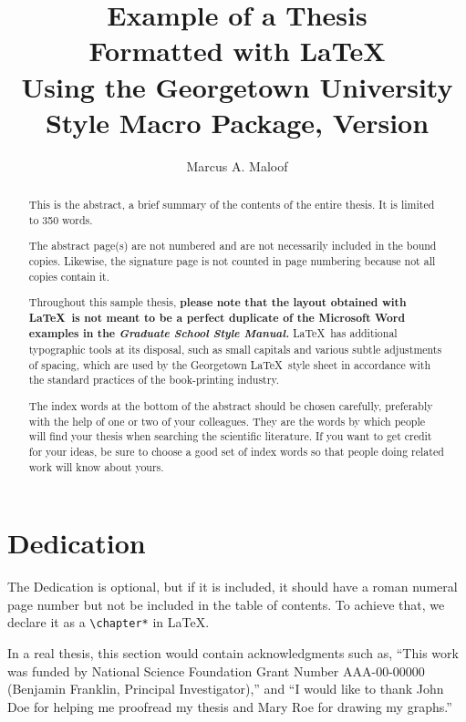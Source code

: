 \documentclass[12pt]{report}
\title{Example of a Thesis \\
       Formatted with LaTeX \\
       Using the Georgetown University \\
       Style Macro Package, Version \guthesisversion}
\author{Marcus A. Maloof}
\begin{document}

\maketitle    %

\begin{abstract}
This is the abstract, a brief summary of the contents of the entire thesis.
It is limited to 350 words.

The abstract page(s) are not numbered and are not necessarily included
in the bound copies.  Likewise, the signature page is not counted in
page numbering because not all copies contain it.

Throughout this sample thesis, {\bf please note
that the layout obtained with \LaTeX\ is not meant to be a
perfect duplicate of the Microsoft Word examples in the \emph{Graduate
School Style Manual.}}  \LaTeX\ has additional typographic tools at its
disposal, such as {\sc small capitals} and various subtle adjustments
of spacing, which are used by the Georgetown \LaTeX\ style sheet in
accordance with the standard practices of the book-printing industry.

The index words at the bottom of the abstract should be chosen carefully,
preferably with the help of one or two of your colleagues.
They are the words by which people will find your thesis when searching
the scientific literature.
If you want to get credit for your ideas, be sure to choose a good set of
index words so that people doing related work will know about yours.
\end{abstract}


\chapter*{Dedication}

The Dedication is optional, but if it is included, it should have
a roman numeral page number but not be included in the table of
contents.  To achieve that, we declare it as a \verb"\chapter*" in \LaTeX.



In a real thesis, this section would contain acknowledgments such
as, ``This work was funded by National Science Foundation Grant
Number AAA-00-00000 (Benjamin Franklin, Principal Investigator),''
and ``I would like to thank John Doe for helping me proofread my
thesis and Mary Roe for drawing my graphs.''
\end{document}
